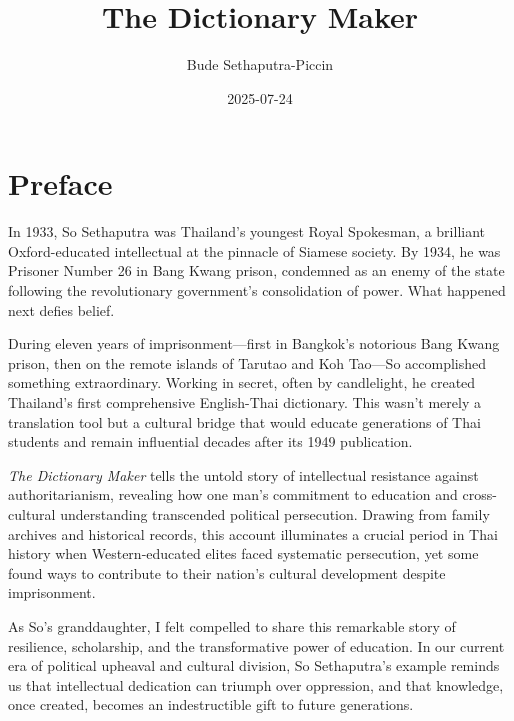 \documentclass[
  Letterpaper,
]{scrbook}
\title{The Dictionary Maker}
\author{Bude Sethaputra-Piccin}
\date{2025-07-24}
\renewcommand*\contentsname{Table of contents}
\newcommand\contentsname{Table of contents}
\begin{document}
\frontmatter
\maketitle

\renewcommand*\contentsname{Table of contents}
{
\setcounter{tocdepth}{1}
\tableofcontents
}

\mainmatter
{}

\chapter*{Preface}\label{preface}


In 1933, So Sethaputra was Thailand's youngest Royal Spokesman, a
brilliant Oxford-educated intellectual at the pinnacle of Siamese
society. By 1934, he was Prisoner Number 26 in Bang Kwang prison,
condemned as an enemy of the state following the revolutionary
government's consolidation of power. What happened next defies belief.

During eleven years of imprisonment---first in Bangkok's notorious Bang
Kwang prison, then on the remote islands of Tarutao and Koh Tao---So
accomplished something extraordinary. Working in secret, often by
candlelight, he created Thailand's first comprehensive English-Thai
dictionary. This wasn't merely a translation tool but a cultural bridge
that would educate generations of Thai students and remain influential
decades after its 1949 publication.

\emph{The Dictionary Maker} tells the untold story of intellectual
resistance against authoritarianism, revealing how one man's commitment
to education and cross-cultural understanding transcended political
persecution. Drawing from family archives and historical records, this
account illuminates a crucial period in Thai history when
Western-educated elites faced systematic persecution, yet some found
ways to contribute to their nation's cultural development despite
imprisonment.

As So's granddaughter, I felt compelled to share this remarkable story
of resilience, scholarship, and the transformative power of education.
In our current era of political upheaval and cultural division, So
Sethaputra's example reminds us that intellectual dedication can triumph
over oppression, and that knowledge, once created, becomes an
indestructible gift to future generations.
\end{document}
